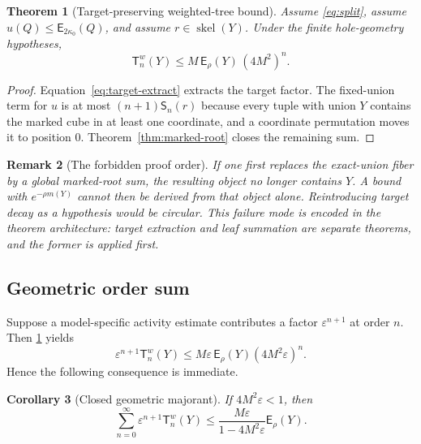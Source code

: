 \documentclass[11pt]{article}
\newtheorem{theorem}{Theorem}[section]
\newtheorem{corollary}[theorem]{Corollary}
\newtheorem{remark}[theorem]{Remark}
\newcommand{\skel}{\operatorname{skel}}
\newcommand{\ExpW}{\mathsf E}
\newcommand{\TargetTerm}{\mathsf T}
\newcommand{\MarkedSum}{\mathsf S}
\begin{document}
\begin{theorem}[Target-preserving weighted-tree bound]\label{thm:target}
Assume \cref{eq:split}, assume $u(Q)\le\ExpW_{2\kappa_0}(Q)$, and assume $r\in\skel(Y)$.  Under the finite hole-geometry hypotheses,
\begin{equation}\label{eq:target-main}
  \TargetTerm_n^w(Y)
  \le
  M\,\ExpW_\rho(Y)\,(4M^2)^n.
\end{equation}
\end{theorem}

\begin{proof}
Equation~\eqref{eq:target-extract} extracts the target factor.  The fixed-union term for $u$ is at most $(n+1)\MarkedSum_n(r)$ because every tuple with union $Y$ contains the marked cube in at least one coordinate, and a coordinate permutation moves it to position $0$.  Theorem~\ref{thm:marked-root} closes the remaining sum.
\end{proof}

\begin{remark}[The forbidden proof order]\label{rem:forbidden-order}
If one first replaces the exact-union fiber by a global marked-root sum, the resulting object no longer contains $Y$.  A bound with $e^{-\rho m(Y)}$ cannot then be derived from that object alone.  Reintroducing target decay as a hypothesis would be circular.  This failure mode is encoded in the theorem architecture: target extraction and leaf summation are separate theorems, and the former is applied first.
\end{remark}

\subsection{Geometric order sum}

Suppose a model-specific activity estimate contributes a factor $\varepsilon^{n+1}$ at order $n$.  Then \cref{thm:target} yields
\[
  \varepsilon^{n+1}\TargetTerm_n^w(Y)
  \le
  M\varepsilon\,\ExpW_\rho(Y)
  (4M^2\varepsilon)^n.
\]
Hence the following consequence is immediate.

\begin{corollary}[Closed geometric majorant]\label{cor:geometric}
If $4M^2\varepsilon<1$, then
\begin{equation}\label{eq:closed-majorant}
  \sum_{n=0}^{\infty}
  \varepsilon^{n+1}\TargetTerm_n^w(Y)
  \le
  \frac{M\varepsilon}{1-4M^2\varepsilon}
  \ExpW_\rho(Y).
\end{equation}
\end{corollary}
\end{document}
